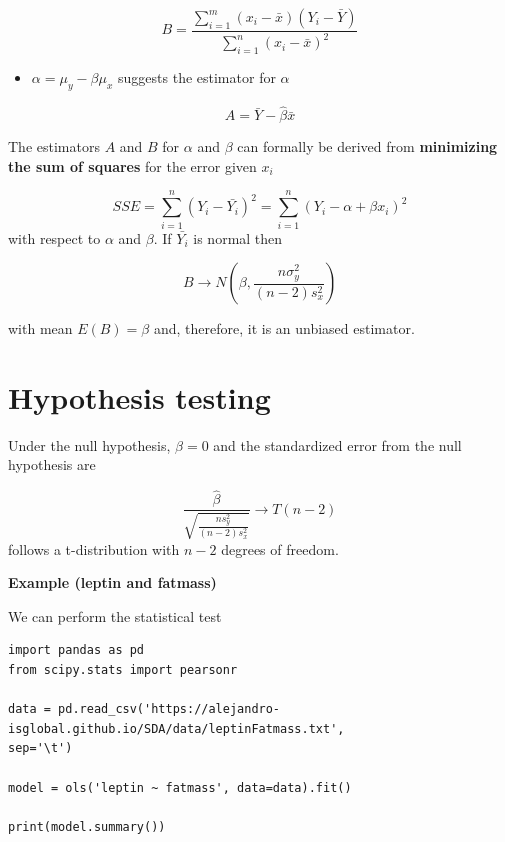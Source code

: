 \documentclass[
]{book}
\providecommand{\tightlist}{%
  \setlength{\itemsep}{0pt}\setlength{\parskip}{0pt}}
\begin{document}
\[B=\frac{\sum_{i=1}^m(x_i-\bar{x})(Y_i-\bar{Y})}{\sum_{i=1}^n(x_i-\bar{x})^2}\]

\begin{itemize}
\tightlist
\item
  \(\alpha=\mu_y-\beta\mu_x\) suggests the estimator for \(\alpha\)
\end{itemize}

\[A=\bar{Y}- \hat{\beta}\bar{x}\]

The estimators \(A\) and \(B\) for \(\alpha\) and \(\beta\) can formally be derived from \textbf{minimizing the sum of squares} for the error given \(x_i\)

\[SSE=\sum_{i=1}^n(Y_i-\bar{Y_i})^2=\sum_{i=1}^n(Y_i-\alpha + \beta x_i)^2\]
with respect to \(\alpha\) and \(\beta\). If \(\bar{Y_i}\) is normal then

\[B \rightarrow N(\beta, \frac{n\sigma^2_y}{{(n-2)s^2_x}})\]

with mean \(E(B)=\beta\) and, therefore, it is an unbiased estimator.

\hypertarget{hypothesis-testing-2}{%
\section{Hypothesis testing}\label{hypothesis-testing-2}}

Under the null hypothesis, \(\beta=0\) and the standardized error from the null hypothesis are

\[\frac{\hat{\beta}}{\sqrt{\frac{ns^2_y}{{(n-2)s^2_x}}}} \rightarrow T(n-2)\]
follows a t-distribution with \(n-2\) degrees of freedom.

\textbf{Example (leptin and fatmass)}

We can perform the statistical test

\begin{verbatim}
import pandas as pd
from scipy.stats import pearsonr

data = pd.read_csv('https://alejandro-isglobal.github.io/SDA/data/leptinFatmass.txt', 
sep='\t')

model = ols('leptin ~ fatmass', data=data).fit()

print(model.summary())
\end{verbatim}
\end{document}
